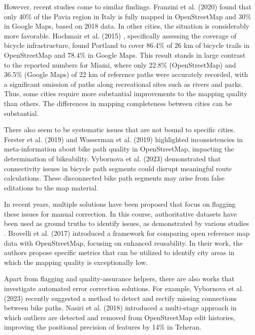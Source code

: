 However, recent studies come to similar findings. Franzini et al. (2020) \cite{franzini_assessment_2020} found that only 40\% of the Pavia region in Italy is fully mapped in OpenStreetMap and 30\% in Google Maps, based on 2018 data. In other cities, the situation is considerably more favorable. Hochmair et al. (2015) \cite{hochmair_assessing_2015}, specifically assessing the coverage of bicycle infrastructure, found Portland to cover 86.4\% of 26 km of bicycle trails in OpenStreetMap and 78.4\% in Google Maps. This result stands in large contrast to the reported numbers for Miami, where only 22.8\% (OpenStreetMap) and 36.5\% (Google Maps) of 22 km of reference paths were accurately recorded, with a significant omission of paths along recreational sites such as rivers and parks. Thus, some cities require more substantial improvements to the mapping quality than others. The differences in mapping completeness between cities can be substantial.

There also seem to be systematic issues that are not bound to specific cities. Ferster et al. (2019) \cite{ferster_using_2019} and Wasserman et al. (2019) \cite{wasserman_evaluating_2019} highlighted inconsistencies in meta-information about bike path quality in OpenStreetMap, impacting the determination of bikeability. Vybornova et al. (2023) \cite{vybornova_automated_2023} demonstrated that connectivity issues in bicycle path segments could disrupt meaningful route calculations. These disconnected bike path segments may arise from false editations to the map material.

In recent years, multiple solutions have been proposed that focus on flagging these issues for manual correction. In this course, authoritative datasets have been used as ground truths to identify issues, as demonstrated by various studies \cite{haklay_how_2010, jokar_arsanjani_quality_2015, ludwig_comparison_2011}. Brovelli et al. (2017) \cite{brovelli_towards_2017} introduced a framework for comparing open reference map data with OpenStreetMap, focusing on enhanced reusability. In their work, the authors propose specific metrics that can be utilized to identify city areas in which the mapping quality is exceptionally low.

Apart from flagging and quality-assurance helpers, there are also works that investigate automated error correction solutions. For example, Vybornova et al. (2023) \cite{vybornova_automated_2023} recently suggested a method to detect and rectify missing connections between bike paths. Nasiri et al. (2018) \cite{nasiri_improving_2018} introduced a multi-stage approach in which outliers are detected and removed from OpenStreetMap edit histories, improving the positional precision of features by 14\% in Teheran.  

